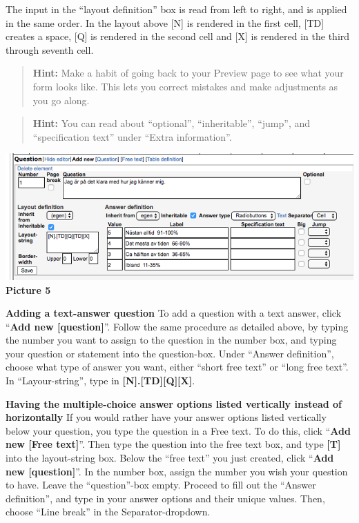\documentclass[]{book}
\begin{document}
The input in the ``layout definition'' box is read from left to right, and is applied in the same order. In the layout above {[}N{]} is rendered in the first cell, {[}TD{]} creates a space, {[}Q{]} is rendered in the second cell and {[}X{]} is rendered in the third through seventh cell.

\begin{quote}
\textbf{Hint:} Make a habit of going back to your Preview page to see what your form looks like. This lets you correct mistakes and make adjustments as you go along.
\end{quote}

\begin{quote}
\textbf{Hint:} You can read about ``optional'', ``inheritable'', ``jump'', and ``specification text'' under ``Extra information''.
\end{quote}

\includegraphics{images/new-images/multiplechoiceQuestion.png}
\textbf{Picture 5}

\textbf{Adding a text-answer question}
To add a question with a text answer, click ``\textbf{Add new {[}question{]}}''. Follow the same procedure as detailed above, by typing the number you want to assign to the question in the number box, and typing your question or statement into the question-box. Under ``Answer definition'', choose what type of answer you want, either ``short free text'' or ``long free text''. In ``Layour-string'', type in \textbf{{[}N{]}.{[}TD{]}{[}Q{]}{[}X{]}}.

\textbf{Having the multiple-choice answer options listed vertically instead of horizontally}
If you would rather have your answer options listed vertically below your question, you type the question in a Free text. To do this, click ``\textbf{Add new {[}Free text{]}}''. Then type the question into the free text box, and type \textbf{{[}T{]}} into the layout-string box.
Below the ``free text'' you just created, click ``\textbf{Add new {[}question{]}}''. In the number box, assign the number you wish your question to have. Leave the ``question''-box empty.
Proceed to fill out the ``Answer definition'', and type in your answer options and their unique values. Then, choose ``Line break'' in the Separator-dropdown.
\end{document}
